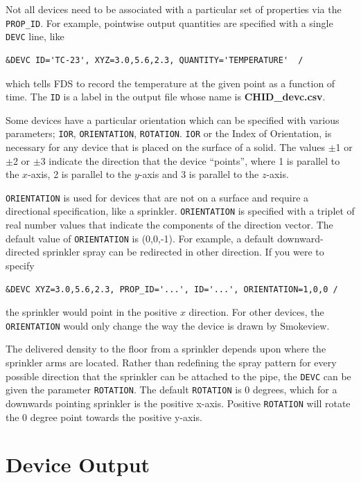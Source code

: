 \documentclass[11pt]{book}
\newcommand{\ct}{\tt\small}
\begin{document}
Not all devices need to be associated with a particular set of properties via the {\ct PROP\_ID}. For example, pointwise
output quantities are specified with a single {\ct DEVC} line, like

\footnotesize
\begin{verbatim}
&DEVC ID='TC-23', XYZ=3.0,5.6,2.3, QUANTITY='TEMPERATURE'  /
\end{verbatim}
\normalsize

\noindent
which tells FDS to record the temperature at the given point as a function of time. The {\ct ID} is a label in the output file whose name
is {\bf CHID\_devc.csv}.

Some devices have a particular orientation which can be specified
with various parameters; {\ct IOR}, {\ct ORIENTATION}, {\ct ROTATION}.
{\ct IOR} or the Index of Orientation, is necessary for any device that is
placed on the surface of a solid. The values $\pm$1 or $\pm$2 or $\pm$3 indicate the direction
that the device ``points'', where 1 is parallel to the $x$-axis, 2 is parallel to the $y$-axis
and 3 is parallel to the $z$-axis.

{\ct ORIENTATION} is used for devices that are not on a surface
and require a directional specification, like a sprinkler. {\ct ORIENTATION} is specified with a
triplet of real number values that indicate the components of the direction vector.
The default value of {\ct ORIENTATION} is (0,0,-1).
For example, a default downward-directed sprinkler spray can be redirected in other direction.
If you were to specify

\footnotesize
\begin{verbatim}
&DEVC XYZ=3.0,5.6,2.3, PROP_ID='...', ID='...', ORIENTATION=1,0,0 /
\end{verbatim}
\normalsize

\noindent
the sprinkler would point in the positive $x$ direction.
For other devices, the {\ct ORIENTATION} would only change the way the device is drawn by Smokeview.

The delivered density to the floor from a sprinkler depends upon where the sprinkler arms are located.  Rather than redefining the spray pattern for every possible direction that the sprinkler can be attached to the pipe, the {\ct DEVC} can be given the parameter {\ct ROTATION}.  The default {\ct ROTATION} is 0 degrees, which for a downwards pointing sprinkler is the positive x-axis.  Positive {\ct ROTATION} will rotate the 0 degree point towards the positive y-axis.

\section{Device Output}
\label{info:out:DEVC}
\end{document}
